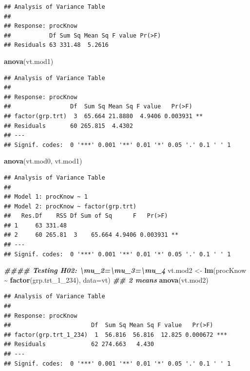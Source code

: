 \documentclass[
]{book}
\newenvironment{Shaded}{\begin{snugshade}}{\end{snugshade}}
\newcommand{\AttributeTok}[1]{\textcolor[rgb]{0.13,0.29,0.53}{#1}}
\newcommand{\DocumentationTok}[1]{\textcolor[rgb]{0.56,0.35,0.01}{\textbf{\textit{#1}}}}
\newcommand{\FunctionTok}[1]{\textcolor[rgb]{0.13,0.29,0.53}{\textbf{#1}}}
\newcommand{\NormalTok}[1]{#1}
\newcommand{\OtherTok}[1]{\textcolor[rgb]{0.56,0.35,0.01}{#1}}
\newcommand{\SpecialCharTok}[1]{\textcolor[rgb]{0.81,0.36,0.00}{\textbf{#1}}}
\begin{document}
\begin{verbatim}
## Analysis of Variance Table
## 
## Response: procKnow
##           Df Sum Sq Mean Sq F value Pr(>F)
## Residuals 63 331.48  5.2616
\end{verbatim}

\begin{Shaded}
\begin{Highlighting}[]
\FunctionTok{anova}\NormalTok{(vt.mod1)}
\end{Highlighting}
\end{Shaded}

\begin{verbatim}
## Analysis of Variance Table
## 
## Response: procKnow
##                 Df  Sum Sq Mean Sq F value   Pr(>F)   
## factor(grp.trt)  3  65.664 21.8880  4.9406 0.003931 **
## Residuals       60 265.815  4.4302                    
## ---
## Signif. codes:  0 '***' 0.001 '**' 0.01 '*' 0.05 '.' 0.1 ' ' 1
\end{verbatim}

\begin{Shaded}
\begin{Highlighting}[]
\FunctionTok{anova}\NormalTok{(vt.mod0, vt.mod1)}
\end{Highlighting}
\end{Shaded}

\begin{verbatim}
## Analysis of Variance Table
## 
## Model 1: procKnow ~ 1
## Model 2: procKnow ~ factor(grp.trt)
##   Res.Df    RSS Df Sum of Sq      F   Pr(>F)   
## 1     63 331.48                                
## 2     60 265.81  3    65.664 4.9406 0.003931 **
## ---
## Signif. codes:  0 '***' 0.001 '**' 0.01 '*' 0.05 '.' 0.1 ' ' 1
\end{verbatim}

\begin{Shaded}
\begin{Highlighting}[]
\DocumentationTok{\#\#\#\# Testing H02: \textbackslash{}mu\_2=\textbackslash{}mu\_3=\textbackslash{}mu\_4}
\NormalTok{vt.mod2 }\OtherTok{\textless{}{-}} \FunctionTok{lm}\NormalTok{(procKnow }\SpecialCharTok{\textasciitilde{}} \FunctionTok{factor}\NormalTok{(grp.trt\_1\_234), }\AttributeTok{data=}\NormalTok{vt)   }\DocumentationTok{\#\# 2 means}
\FunctionTok{anova}\NormalTok{(vt.mod2)}
\end{Highlighting}
\end{Shaded}

\begin{verbatim}
## Analysis of Variance Table
## 
## Response: procKnow
##                       Df  Sum Sq Mean Sq F value   Pr(>F)    
## factor(grp.trt_1_234)  1  56.816  56.816  12.825 0.000672 ***
## Residuals             62 274.663   4.430                     
## ---
## Signif. codes:  0 '***' 0.001 '**' 0.01 '*' 0.05 '.' 0.1 ' ' 1
\end{verbatim}
\end{document}
